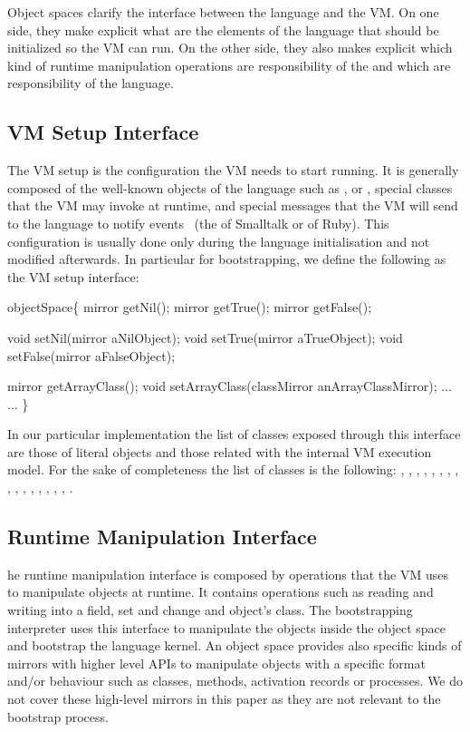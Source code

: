 Object spaces clarify the interface between the language and the VM. On one side, they make explicit what are the elements of the language that should be initialized so the VM can run. On the other side, they also makes explicit which kind of runtime manipulation operations are responsibility of the \VM and which are responsibility of the language.

\subsection{VM Setup Interface}

The VM setup is the configuration the VM needs to start running. It is generally composed of the well-known objects of the language such as ,  or , special classes that the VM may invoke at runtime, and special messages that the VM will send to the language to notify events ~(\eg the  of Smalltalk or  of Ruby). This configuration is usually done only during the language initialisation and not modified afterwards. In particular for bootstrapping, we define the following as the VM setup interface:

\begin{code}
objectSpace\{
    mirror getNil();
    mirror getTrue();
    mirror getFalse();

    void setNil(mirror aNilObject);
    void setTrue(mirror aTrueObject);
    void setFalse(mirror aFalseObject);
    
    mirror getArrayClass();
    void setArrayClass(classMirror anArrayClassMirror);
    ...
    ...
\}
\end{code}

In our particular implementation the list of classes exposed through this interface are those of literal objects and those related with the internal VM execution model. For the sake of completeness the list of classes is the following: , , , , , , , , , , , , , , , , .

\subsection{Runtime Manipulation Interface} he runtime manipulation interface is composed by operations that the VM uses to manipulate objects at runtime. It contains operations such as reading and writing into a field, set and change and object's class. The bootstrapping interpreter uses this interface to manipulate the objects inside the object space and bootstrap the language kernel. An object space provides also specific kinds of mirrors with higher level APIs to manipulate objects with a specific format and/or behaviour such as classes, methods, activation records or processes. We do not cover these high-level mirrors in this paper as they are not relevant to the bootstrap process.

